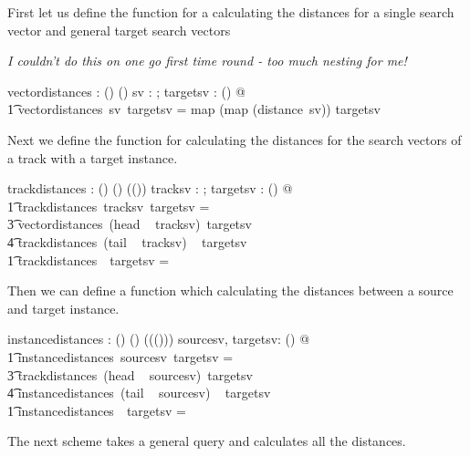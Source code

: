 \documentclass[11pt]{article}
\begin{document}
\begin{enumerate}
First let us define the function for a calculating the distances for a single search vector and general target search vectors 

\emph{I couldn't do this on one go first time round - too much nesting for me!}

\begin{axdef}		
	vectordistances : \Vdsl \fun \seq (\seq \Vdsl) \fun \seq (\seq \R) 
\where
	\forall sv : \Vdsl; targetsv : \seq (\seq \Vdsl) @ \\
	\t1  vectordistances~sv~targetsv = map (map (distance~sv)) targetsv
\end{axdef}

Next we define the function for calculating the distances for the search vectors of a track with a target instance. 

\begin{axdef}		
	trackdistances : (\seq \Vdsl) \fun \seq (\seq \Vdsl) \fun \seq (\seq (\seq \R)) 
\where
	\forall tracksv : \seq \Vdsl; targetsv : \seq (\seq \Vdsl) @ \\
	\t1  trackdistances~tracksv~targetsv = \\
	\t3 \langle vectordistances~(head ~ tracksv)~targetsv \rangle \cat \\
     \t4										  trackdistances~(tail ~ tracksv) ~ targetsv \land \\
     \t1  trackdistances~\langle \rangle ~targetsv = \langle \langle \langle \rangle \rangle \rangle 
\end{axdef} 
     
Then we can define a function which calculating the distances between a source and target instance. 

\begin{axdef}		
	instancedistances : \seq (\seq \Vdsl) \fun \seq (\seq \Vdsl) \fun \seq (\seq (\seq (\seq \R)))
\where
	\forall sourcesv, targetsv: \seq (\seq \Vdsl) @ \\
	\t1  instancedistances~sourcesv~targetsv = \\
	\t3 \langle trackdistances~(head ~ sourcesv)~targetsv \rangle \cat \\
     \t4 										  instancedistances~(tail ~ sourcesv) ~ targetsv  \land \\
     \t1  instancedistances~\langle \langle \rangle \rangle ~targetsv = \langle  \langle \langle \langle \rangle \rangle \rangle \rangle
\end{axdef}

The next scheme takes a general query and calculates all the distances.


\end{enumerate}
\end{document}
